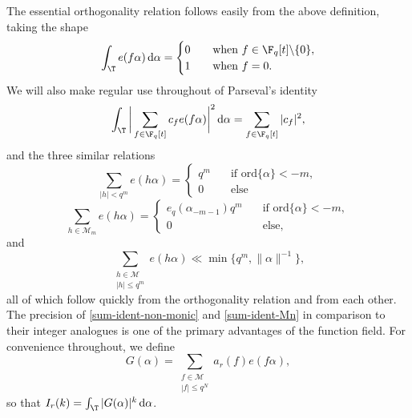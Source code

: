 \documentclass[reqno,11pt]{amsart}
\theoremstyle{definition}
\theoremstyle{remark}
\numberwithin{equation}{section}
\def\calM{{\mathcal M}}
\def\setmin{{\setminus\!\,}}
\renewcommand{\d}{\,{\rm d}} %
\newcommand{\<}{\begin{equation}}
\renewcommand{\>}{\end{equation}}
\begin{document}
The essential orthogonality relation follows easily from the above definition, taking the shape
\[\int_\T e(f\alpha) \d\alpha = \begin{cases}
    0 \quad &\text{when } f \in \F_q[t]\setmin\{0\}, \\
    1 \quad &\text{when } f = 0.
\end{cases}\]
We will also make regular use throughout of Parseval's identity
\[\int_\T \bigg|\sum_{f \in \F_q[t]} c_f e(f\alpha)\bigg|^2 \d\alpha = \sum_{f \in \F_q[t]} |c_f|^2,\]
and the three similar relations
\<\label{sum-ident-non-monic}
    \sum_{|h|<q^m}e(h\alpha) = \begin{cases}
    q^{m} \quad &\text{if } \text{ord}\{\alpha\} < -m, \\
    0 \quad &\text{else}
    \end{cases}
\> 
\<\label{sum-ident-Mn}
    \sum_{h \in \calM_m} e(h\alpha) = \begin{cases}
    e_q(\alpha_{-m-1})q^{m} \quad &\text{if } \text{ord}\{\alpha\} < -m, \\
    0 \quad &\text{else,}
    \end{cases}
\>
and
\<\label{sum-bound-monic}
    \sum_{\substack{h \in \calM \\ |h| \leq q^m}} e(h\alpha) \ll \min\{q^m,\|\alpha\|^{-1}\},
\>
all of which follow quickly from the orthogonality relation and from each other. The precision of \eqref{sum-ident-non-monic} and \eqref{sum-ident-Mn} in comparison to their integer analogues is one of the primary advantages of the function field. For convenience throughout, we define
\[G(\alpha) = \sum_{\substack{f \in \calM \\ |f| \leq q^N}}a_r(f) e(f\alpha),\]
so that $I_r(k) = \int_\T |G(\alpha)|^k \d\alpha$.
\end{document}
